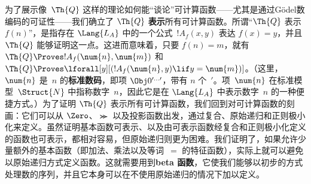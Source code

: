 为了展示像~$\Th{Q}$ 这样的理论如何能“谈论”可计算函数——尤其是通过Gödel数编码的可证性——我们确立了 $\Th{Q}$ \textbf{表示}所有可计算函数。所谓“$\Th{Q}$ 表示 $f(n)$”，是指存在 $\Lang{L_A}$ 中的一个公式~$!A_f(x, y)$ 表达 $f(x) = y$，并且 $\Th{Q}$ 能够证明这一点。这进而意味着，只要 $f(n) = m$，就有 $\Th{Q} \Proves !A_f(\num{n},
\num{m})$ 和 $\Th{Q} \Proves \lforall[y][(!A_f(\num{n}, y) \lif y =
\num{m})]$。（这里，$\num{n}$ 是~$n$ 的\textbf{标准数码}，即项 $\Obj 0^{\prime\dots\prime}$，带有 $n$ 个~$\prime$。项~$\num{n}$ 在标准模型~$\Struct{N}$ 中指称数字~$n$，因此它是在 $\Lang{L_A}$ 中表示数字~$n$ 的一种便捷方式。）为了证明 $\Th{Q}$ 表示所有可计算函数，我们回到对可计算函数的刻画：它们可以从 $\Zero$、$\Succ$ 以及投影函数出发，通过复合、原始递归和正则极小化来定义。虽然证明基本函数可表示、以及由可表示函数经复合和正则极小化定义的函数也可表示，都相对容易，但原始递归则更为困难。我们证明了，如果允许少量额外的基本函数（即加法、乘法以及等词~$=$ 的特征函数），实际上就可以避免以原始递归方式定义函数。这就需要用到\textbf{beta 函数}，它使我们能够以初步的方式处理数的序列，并且它本身可以在不使用原始递归的情况下加以定义。
